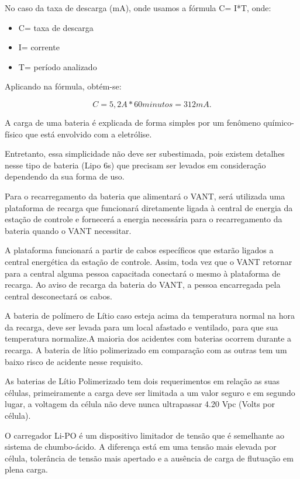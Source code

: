 No caso da taxa de descarga (mA), onde usamos a fórmula C= I*T, onde:

\begin{itemize}
	\item C= taxa de descarga
	\item I= corrente
	\item T= período analizado
\end{itemize}

Aplicando na fórmula, obtém-se: 

\begin{equation}
C= 5,2A* 60 minutos = 312mA.
\end{equation}


A carga de uma bateria é explicada de forma simples por um fenômeno químico-físico que está envolvido com a eletrólise. \cite{gibbs}

Entretanto, essa simplicidade não deve ser subestimada, pois existem detalhes nesse tipo de bateria (Lipo 6s) que precisam ser levados em consideração dependendo da sua forma de uso.

Para o recarregamento da bateria que alimentará o VANT, será utilizada uma plataforma de recarga que funcionará diretamente ligada à  central de energia da estação de controle e fornecerá a energia necessária para o recarregamento da bateria quando o VANT necessitar.

A plataforma funcionará a partir de cabos específicos que estarão ligados a central energética da estação de controle. Assim, toda vez que o VANT retornar para a central alguma pessoa capacitada conectará o mesmo à plataforma de recarga. Ao aviso de recarga da bateria do VANT, a pessoa encarregada pela central desconectará os cabos.

A bateria de polímero de Lítio caso esteja acima da temperatura normal na hora da recarga, deve ser levada para um local afastado e ventilado, para que sua temperatura normalize.A maioria dos acidentes com baterias ocorrem durante a recarga. A bateria de lítio polimerizado em comparação com as outras tem um baixo risco de acidente nesse requisito. \cite{gibbs}

As baterias de Lítio Polimerizado tem dois requerimentos em relação as suas células, primeiramente a carga deve ser limitada a um valor seguro e em segundo lugar, a voltagem da célula não deve nunca ultrapassar 4.20 Vpc (Volts por célula). \cite{gibbs}

O carregador Li-PO é um dispositivo limitador de tensão que é semelhante ao sistema de chumbo-ácido. A diferença está em uma tensão mais elevada por célula, tolerância de tensão mais apertado e a ausência de carga de flutuação em plena carga.

